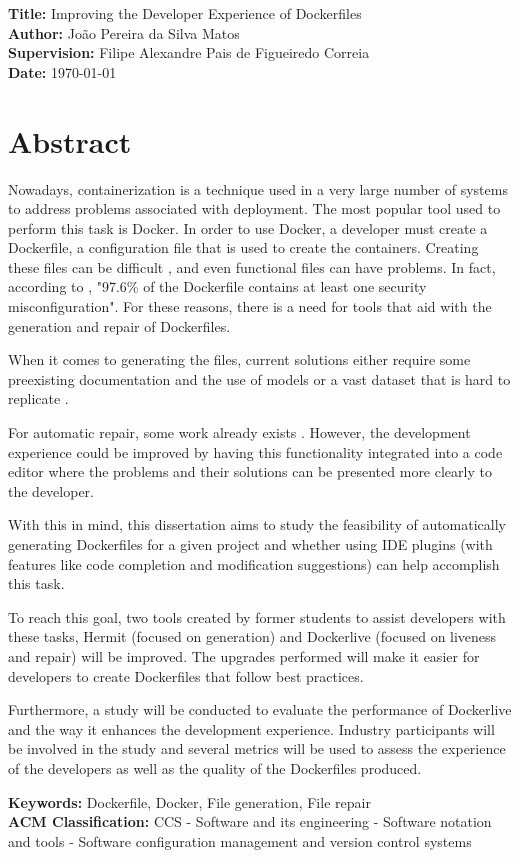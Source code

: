 \documentclass[11pt,a4paper]{article}
\newcommand{\titles}[2]{\noindent\textbf{#1:} #2\\[2mm]}
\begin{document}
\titles{Title}{Improving the Developer Experience of Dockerfiles}
\titles{Author}{João Pereira da Silva Matos}
\titles{Supervision}{Filipe Alexandre Pais de Figueiredo Correia}
\titles{Date}{\today}

\section*{Abstract}

Nowadays, containerization is a technique used in a very large number of systems to address problems associated with deployment. The most popular tool used to perform this task is Docker. In order to use Docker, a developer must create a Dockerfile, a configuration file that is used to create the containers. Creating these files can be difficult \cite{reisLiveDockerContainers2020}, and even functional files can have problems. In fact, according to \cite{prinettoSecurityMisconfigurationsDetection}, "97.6\% of the Dockerfile contains at least one security misconfiguration". For these reasons, there is a need for tools that aid with the generation and repair of Dockerfiles.

When it comes to generating the files, current solutions either require some preexisting documentation and the use of models \cite{tomyModusDatalogDialect2022} or a vast dataset that is hard to replicate \cite{yeDockerGenKnowledgeGraph2021a}.

For automatic repair, some work already exists \cite{henkelShipwrightHumanintheLoopSystem2021}. However, the development experience could be improved by having this functionality integrated into a code editor where the problems and their solutions can be presented more clearly to the developer.

With this in mind, this dissertation aims to study the feasibility of automatically generating Dockerfiles for a given project and whether using IDE plugins (with features like code completion and modification suggestions) can help accomplish this task.

To reach this goal, two tools created by former students to assist developers with these tasks, Hermit \cite{maduroAutomaticServiceContainerization2021} (focused on generation) and Dockerlive \cite{reisLiveDockerContainers2020} (focused on liveness and repair) will be improved. The upgrades performed will make it easier for developers to create Dockerfiles that follow best practices. 

Furthermore, a study will be conducted to evaluate the performance of Dockerlive and the way it enhances the development experience. Industry participants will be involved in the study and several metrics will be used to assess the experience of the developers as well as the quality of the Dockerfiles produced.

\titles{Keywords}{Dockerfile, Docker, File generation, File repair}
\titles{ACM Classification}{CCS - Software and its engineering - Software notation and tools - Software configuration management and version control systems
}






\end{document}
